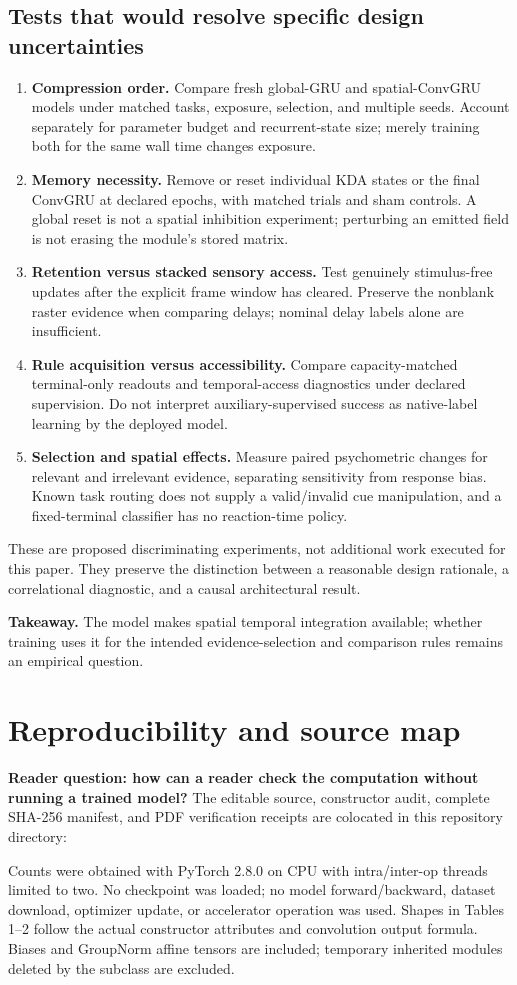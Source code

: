 \documentclass[10pt,letterpaper]{article}
\newcommand{\takeaway}[1]{\par\smallskip\noindent\textbf{Takeaway.} #1}
\newcommand{\psection}[1]{\clearpage\section{#1}}
\begin{document}
\subsection{Tests that would resolve specific design uncertainties}
\begin{enumerate}[label=\textbf{\arabic*.}]
\item \textbf{Compression order.} Compare fresh global-GRU and spatial-ConvGRU models under matched tasks, exposure, selection, and multiple seeds. Account separately for parameter budget and recurrent-state size; merely training both for the same wall time changes exposure.
\item \textbf{Memory necessity.} Remove or reset individual KDA states or the final ConvGRU at declared epochs, with matched trials and sham controls. A global reset is not a spatial inhibition experiment; perturbing an emitted field is not erasing the module's stored matrix.
\item \textbf{Retention versus stacked sensory access.} Test genuinely stimulus-free updates after the explicit frame window has cleared. Preserve the nonblank raster evidence when comparing delays; nominal delay labels alone are insufficient.
\item \textbf{Rule acquisition versus accessibility.} Compare capacity-matched terminal-only readouts and temporal-access diagnostics under declared supervision. Do not interpret auxiliary-supervised success as native-label learning by the deployed model.
\item \textbf{Selection and spatial effects.} Measure paired psychometric changes for relevant and irrelevant evidence, separating sensitivity from response bias. Known task routing does not supply a valid/invalid cue manipulation, and a fixed-terminal classifier has no reaction-time policy.
\end{enumerate}
These are proposed discriminating experiments, not additional work executed for this paper. They preserve the distinction between a reasonable design rationale, a correlational diagnostic, and a causal architectural result.
\takeaway{The model makes spatial temporal integration available; whether training uses it for the intended evidence-selection and comparison rules remains an empirical question.}

\psection{Reproducibility and source map}
\textbf{Reader question: how can a reader check the computation without running a trained model?}
\small
The editable source, constructor audit, complete SHA-256 manifest, and PDF verification receipts are colocated in this repository directory:
\begin{center}\end{center}
Counts were obtained with PyTorch 2.8.0 on CPU with intra/inter-op threads limited to two. No checkpoint was loaded; no model forward/backward, dataset download, optimizer update, or accelerator operation was used. Shapes in Tables 1--2 follow the actual constructor attributes and convolution output formula. Biases and GroupNorm affine tensors are included; temporary inherited modules deleted by the subclass are excluded.
\end{document}
